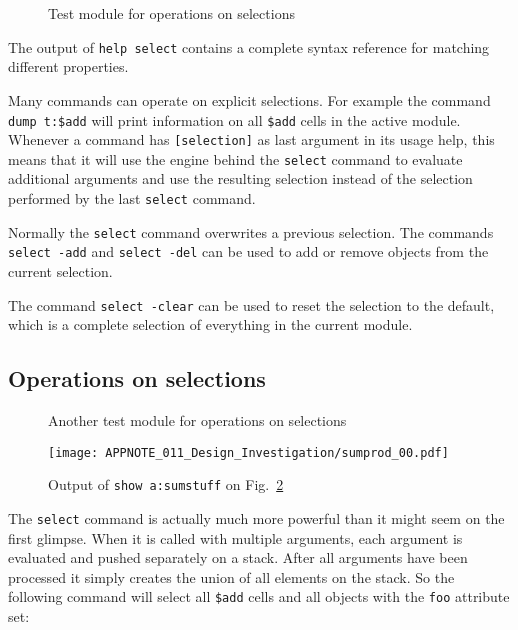 \documentclass[9pt,technote,a4paper]{IEEEtran}
\begin{document}
\begin{figure}[b]

\caption{Test module for operations on selections}
\label{foobaraddsub}
\end{figure}

The output of {\tt help select} contains a complete syntax reference for
matching different properties.

Many commands can operate on explicit selections. For example the command {\tt
dump t:\$add} will print information on all {\tt \$add} cells in the active
module. Whenever a command has {\tt [selection]} as last argument in its usage
help, this means that it will use the engine behind the {\tt select} command
to evaluate additional arguments and use the resulting selection instead of
the selection performed by the last {\tt select} command.

Normally the {\tt select} command overwrites a previous selection. The
commands {\tt select -add} and {\tt select -del} can be used to add
or remove objects from the current selection.

The command {\tt select -clear} can be used to reset the selection to the
default, which is a complete selection of everything in the current module.

\subsection{Operations on selections}

\begin{figure}[t]

\caption{Another test module for operations on selections}
\label{sumprod}
\end{figure}

\begin{figure}[b]
\texttt{[image: APPNOTE\_011\_Design\_Investigation/sumprod\_00.pdf]}
\caption{Output of {\tt show a:sumstuff} on Fig.~\ref{sumprod}}
\label{sumprod_00}
\end{figure}

The {\tt select} command is actually much more powerful than it might seem on
the first glimpse. When it is called with multiple arguments, each argument is
evaluated and pushed separately on a stack. After all arguments have been
processed it simply creates the union of all elements on the stack. So the
following command will select all {\tt \$add} cells and all objects with
the {\tt foo} attribute set:
\end{document}
